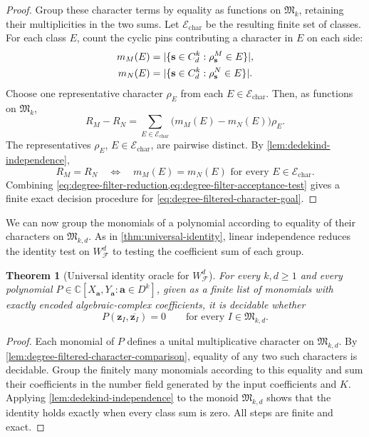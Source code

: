 \documentclass[11pt,letterpaper,onecolumn]{article}
\theoremstyle{plain}
\newtheorem{theorem}{Theorem}[section]
\theoremstyle{definition}
\theoremstyle{remark}
\newcommand{\AlgNums}{\mathbb C}
\newcommand{\cF}{\mathcal F}
\newcommand{\WFdeg}[1]{W_{\cF}^{#1}}
\newcommand{\zvec}[1]{\mathbf z_{#1}}
\newcommand{\InstMonoid}[1]{\mathfrak M_{#1}}
\DeclarePairedDelimiter{\abs}{\lvert}{\rvert}
\begin{document}
\begin{proof}
Group these character terms by equality as functions on
$\InstMonoid{k}$, retaining their multiplicities in the two sums.  Let
$\mathcal E_{\mathrm{char}}$ be the resulting finite set of classes.
For each class $E$, count the cyclic pins contributing a character in $E$
on each side:
\begin{equation*}
\begin{aligned}
  m_M(E)&=\abs{\{\mathbf s\in C_d^k:
                    \rho^M_{\mathbf s}\in E\}},\\
  m_N(E)&=\abs{\{\mathbf s\in C_d^k:
                    \rho^N_{\mathbf s}\in E\}}.
\end{aligned}
\end{equation*}
Choose one representative character $\rho_E$ from each
$E\in\mathcal E_{\mathrm{char}}$.
Then, as functions on $\InstMonoid{k}$,
\begin{equation*}
  R_M-R_N
  =\sum_{E\in\mathcal E_{\mathrm{char}}}
     \bigl(m_M(E)-m_N(E)\bigr)\rho_E.
\end{equation*}
The representatives $\rho_E$, $E\in\mathcal E_{\mathrm{char}}$, are
pairwise distinct.  By
\cref{lem:dedekind-independence},
\begin{equation}
  R_M=R_N\quad\Longleftrightarrow\quad
  m_M(E)=m_N(E)\text{ for every }E\in\mathcal E_{\mathrm{char}}.
  \label{eq:degree-filter-acceptance-test}
\end{equation}
Combining
\cref{eq:degree-filter-reduction,eq:degree-filter-acceptance-test}
gives a finite exact decision procedure
for \eqref{eq:degree-filtered-character-goal}.
\end{proof}

We can now group the monomials of a polynomial according to equality of
their characters on $\mathfrak M_{k,d}$.  As in
\cref{thm:universal-identity}, linear independence reduces the identity
test on $\WFdeg{d}$ to testing the coefficient sum of each group.

\begin{theorem}[Universal identity oracle for $\WFdeg{d}$]
\label{thm:degree-multiple-universal-identity}
For every $k,d\ge1$ and every polynomial $P\in\AlgNums[X_{\mathbf a},Y_{\mathbf a}:\mathbf a\in D^k]$, given as a finite list of monomials with exactly encoded algebraic-complex
coefficients, it is decidable whether
\[
  P(\zvec I,\overline{\zvec I})=0
  \qquad\text{for every }I\in\mathfrak M_{k,d}.
\]
\end{theorem}

\begin{proof}
Each monomial of $P$ defines a unital multiplicative character on
$\mathfrak M_{k,d}$.  By \cref{lem:degree-filtered-character-comparison},
equality of any two such characters is decidable.  Group the finitely many
monomials according to this equality and sum their coefficients in the number
field generated by the input coefficients and $K$.  Applying
\cref{lem:dedekind-independence} to the monoid $\mathfrak M_{k,d}$ shows
that the identity
holds exactly when every class sum is zero.  All steps are finite and exact.
\end{proof}
\end{document}
